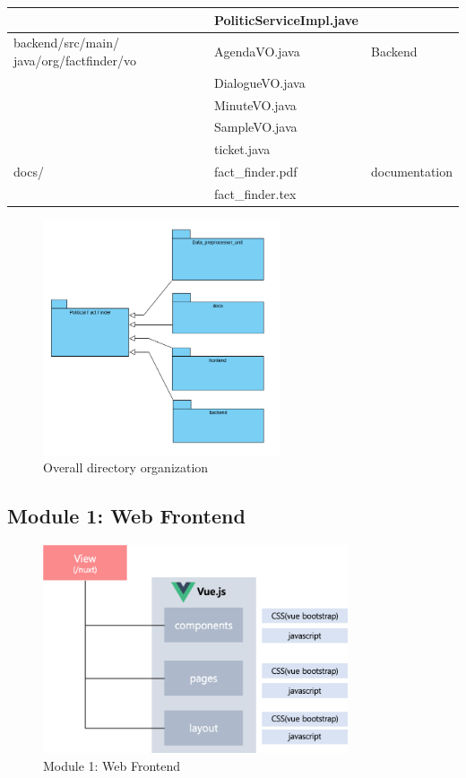\documentclass[conference]{IEEEtran}
\begin{document}
\begin{table}[htbp]
\begin{center}
\begin{tabular}{|p{2.5cm}|p{3.7cm}|p{1.5cm}|}
& PoliticServiceImpl.jave & \\
\hline
backend/src/main/ java/org/factfinder/vo & AgendaVO.java & Backend \\
&DialogueVO.java & \\
&MinuteVO.java & \\
&SampleVO.java & \\
&ticket.java & \\
\hline
docs/ & fact\_finder.pdf & documentation \\
& fact\_finder.tex & \\
\hline
\end{tabular}
\label{tab1}
\end{center}
\end{table}


\begin{figure}[htbp]
\centerline{\includegraphics[width=70mm,scale=0.5]{fig/overall.png}}
\caption{Overall directory organization}
\label{fig}
\end{figure}


\subsection{Module 1: Web Frontend}

\begin{figure}[htbp]
\centerline{\includegraphics[width=90mm,scale=0.5]{fig/6_4.png}}
\caption{Module 1: Web Frontend}
\label{fig}
\end{figure}
\end{document}
